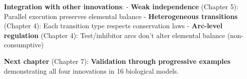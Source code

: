 \textbf{Integration with other innovations}: - \textbf{Weak
independence} (Chapter 5): Parallel execution preserves elemental
balance - \textbf{Heterogeneous transitions} (Chapter 4): Each
transition type respects conservation laws - \textbf{Arc-level
regulation} (Chapter 4): Test/inhibitor arcs don't alter elemental
balance (non-consumptive)

\textbf{Next chapter} (Chapter 7): \textbf{Validation through
progressive examples} demonstrating all four innovations in 16
biological models.
